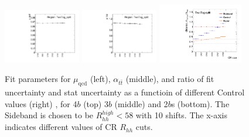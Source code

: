 \begin{figure}[htbp!]
\begin{center}
\includegraphics[angle=270, width=0.3\textwidth]{./figures/boosted/Appendix_SB/TwoTag_split_muqcdCR.pdf}
\includegraphics[angle=270, width=0.3\textwidth]{./figures/boosted/Appendix_SB/TwoTag_split_mutopCR.pdf}
\includegraphics[angle=270, width=0.33\textwidth]{./figures/boosted/Appendix_SB/data_est_TwoTag_split_sigma_compareCR.pdf}
  \caption{Fit parameters for $\mu_{\text{qcd}}$ (left), $\alpha_{t\bar{t}}$ (middle), and ratio of fit uncertainty and stat uncertainty as a functioin of different Control values (right) , for 4$b$ (top) 3$b$ (middle) and 2$b$s (bottom). The Sideband is chosen to be $R_{hh}^{high} < 58$ with 10 \GeV shifts. The x-axis indicates different values of CR $R_{hh}$ cuts.}
  \label{fig:app-sb-muqcd-diffCR}
\end{center}
\end{figure}
